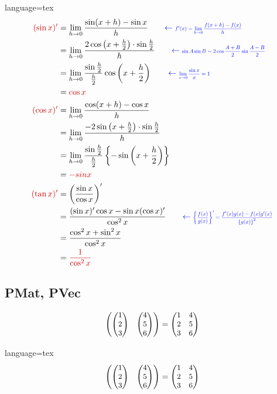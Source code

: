 \documentclass[../main]{subfiles}
\begin{document}
\begin{Code}{language=tex}
    \begin{align*}
        \EmLight{(\sin x)'} &= \lim_{h\to 0}\frac{\sin(x+h)-\sin x}{h}
        \qquad \ExprNote{f'(x) = \lim_{h\to 0}\frac{f(x+h)-f(x)}{h}} \\
        &= \lim_{h\to 0}\frac{2\cos\left(x+\frac{h}{2}\right)\cdot\sin\frac{h}{2}}{h}
        \qquad \ExprNote{\sin A\sin B = 2\cos\frac{A+B}{2}\sin\frac{A-B}{2}} \\
        &= \lim_{h\to 0}\frac{\sin\frac{h}{2}}{\frac{h}{2}}\cos\left(x+\frac{h}{2}\right)
        \qquad \ExprNote{\lim_{x\to 0}\frac{\sin x}{x} = 1} \\
        &= \EmLight{\cos x} \\
        \EmLight{(\cos x)'} &= \lim_{h\to 0}\frac{\cos(x+h)-\cos x}{h} \\
        &= \lim_{h\to 0}\frac{-2\sin\left(x+\frac{h}{2}\right)\cdot\sin\frac{h}{2}}{h} \\
        &= \lim_{h\to 0}\frac{\sin\frac{h}{2}}{\frac{h}{2}}
        \left\{-\sin\left(x+\frac{h}{2}\right)\right\} \\
        &= \EmLight{-sin x} \\
        \EmLight{(\tan x)'} &= \left(\frac{\sin x}{\cos x}\right)' \\
        &= \frac{(\sin x)'\cos x - \sin x(\cos x)'}{\cos^2 x}
        \qquad \ExprNote{
            \left\{
                \frac{f(x)}{g(x)}
            \right\}' = \frac{f'(x)g(x)-f(x)g'(x)}
            {\left\{g(x)\right\}^2}
        } \\
        &= \frac{\cos^2 x + \sin^2 x}{\cos^2 x} \\
        &= \EmLight{\frac{1}{\cos^2 x}}
    \end{align*}
\end{Code}

\subsection{PMat, PVec}

\[
    \PMat{\PVec{1\\2\\3}&\PVec{4\\5\\6}} =
    \PMat{1&4\\2&5\\3&6}
\]
\begin{Code}{language=tex}
\[
    \PMat{\PVec{1\\2\\3}&\PVec{4\\5\\6}} =
    \PMat{1&4\\2&5\\3&6}
\]
\end{Code}
\end{document}
